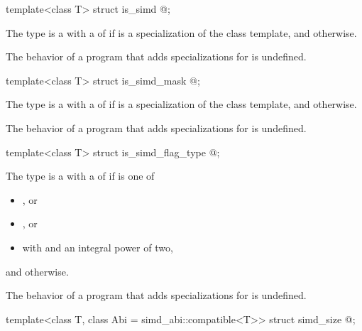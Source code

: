 \begin{itemdecl}
template<class T> struct is_simd { @\seebelow@ };
\end{itemdecl}

\begin{itemdescr}
\pnum
The type  is a  with a  of  if  is a specialization of the  class template, and  otherwise.

\pnum
The behavior of a program that adds specializations for  is undefined.
\end{itemdescr}

\begin{itemdecl}
template<class T> struct is_simd_mask { @\seebelow@ };
\end{itemdecl}

\begin{itemdescr}
\pnum
The type  is a  with a  of  if  is a specialization of the  class template, and  otherwise.

\pnum
The behavior of a program that adds specializations for  is undefined.
\end{itemdescr}

\begin{itemdecl}
template<class T> struct is_simd_flag_type { @\seebelow@ };
\end{itemdecl}

\begin{itemdescr}
\pnum
The type  is a  with a  of  if  is one of
\begin{itemize}
  \item {}, or
  \item {}, or
  \item {} with  and  an integral power of two,
\end{itemize}
and  otherwise.

\pnum
The behavior of a program that adds specializations for  is undefined.
\end{itemdescr}

\begin{itemdecl}
template<class T, class Abi = simd_abi::compatible<T>> struct simd_size { @\seebelow@ };
\end{itemdecl}

